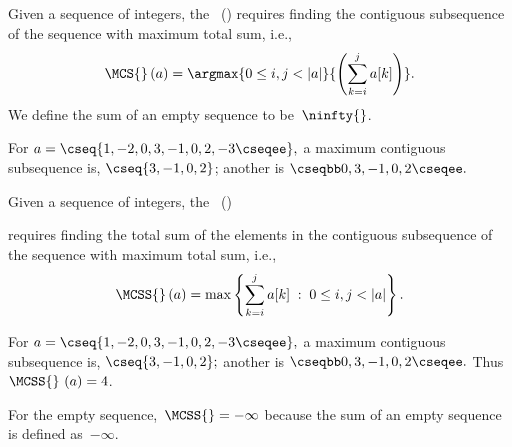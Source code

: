 \begin{flex}
\label{grp:def:mcss::introduction::mcs-problem}

\begin{definition}
\label{def:mcss::introduction::mcs-problem}

Given a sequence of integers, 
the~ (\MCS{}) requires finding the contiguous subsequence of the sequence with maximum total sum, i.e.,
\begin{eqnarray*}
    \MCS{}\,(a) = \argmax{0 \leq i,j < |a|}{\left( \sum_{k=i}^j a[k]  \right)}.
\end{eqnarray*}
We define the sum of an empty sequence to be~$\ninfty{}$.

\end{definition}

\begin{example}
\label{xmpl:mcss::-2}
For 
$a = \cseq{1, -2, 0, 3, -1, 0, 2, -3 \cseqee},$ 
a maximum contiguous subsequence is, 
$\cseq{3, -1, 0, 2}$;
another is 
$\cseqbb 0, 3, -1, 0, 2 \cseqee.$

\end{example}
\end{flex}

\begin{flex}
\label{grp:def:mcss::introduction::mcss-problem}

\begin{definition}
\label{def:mcss::introduction::mcss-problem}
Given a sequence of integers,
the~ (\MCSS{})

requires finding
the total sum of the elements in the contiguous subsequence of the
sequence with maximum total sum, i.e.,
  \begin{eqnarray*}
    \MCSS{}\,(a) = \max \left\{ \sum_{k=i}^j a[k] \;:\; 0 \leq i,j <
      |a| \right\}.
  \end{eqnarray*}

\end{definition}

\begin{example}
\label{xmpl:mcss::-1}
For $a = \cseq{1, -2, 0, 3, -1, 0, 2, -3 \cseqee},$ a maximum contiguous
subsequence is, $\cseq{3, -1, 0, 2};$ 
another is $\cseqbb 0, 3, -1, 0, 2 \cseqee.$
Thus $\MCSS{}~(a) = 4$.

For the empty sequence,~$\MCSS{} = -\infty$ because the sum of an
empty sequence is defined as~$-\infty$.

\end{example}
\end{flex}

